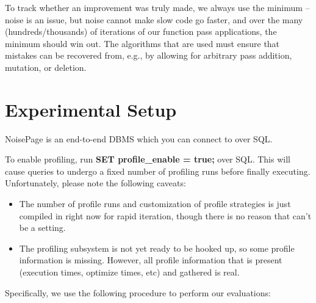 \documentclass{vldb}
\newcommand{\dbCode}[1]{{\sffamily\small \textbf{#1}}\xspace}
\begin{document}
To track whether an improvement was truly made, we always use the minimum -- noise is an issue, but noise cannot make slow code go faster, and over the many (hundreds/thousands) of iterations of our function pass applications, the minimum should win out. The algorithms that are used must ensure that mistakes can be recovered from, e.g., by allowing for arbitrary pass addition, mutation, or deletion.


\section{Experimental Setup}

NoisePage is an end-to-end DBMS which you can connect to over SQL.

To enable profiling, run \dbCode{SET profile\_enable = true;} over SQL. This will cause queries to undergo a fixed number of profiling runs before finally executing. Unfortunately, please note the following caveats:
\begin{itemize}
    \item The number of profile runs and customization of profile strategies is just compiled in right now for rapid iteration, though there is no reason that can't be a setting.
    \item The profiling subsystem is not yet ready to be hooked up, so some profile information is missing. However, all profile information that is present (execution times, optimize times, etc) and gathered is real.
\end{itemize}

Specifically, we use the following procedure to perform our evaluations:
\end{document}
